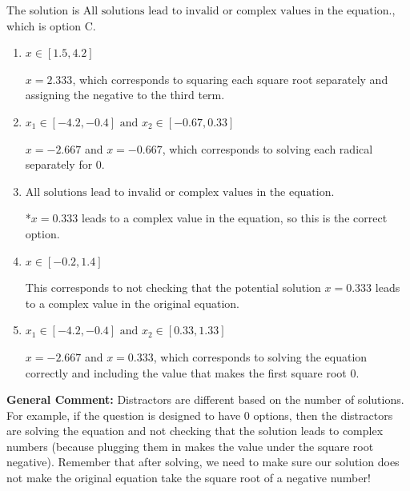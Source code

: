 \documentclass{extbook}[14pt]
\begin{document}
\begin{enumerate}
{The solution is \( \text{All solutions lead to invalid or complex values in the equation.} \), which is option C.\begin{enumerate}[label=\Alph*.]
\item \( x \in [1.5,4.2] \)

$x = 2.333$, which corresponds to squaring each square root separately and assigning the negative to the third term.
\item \( x_1 \in [-4.2, -0.4] \text{ and } x_2 \in [-0.67,0.33] \)

$x = -2.667$ and $x = -0.667$, which corresponds to solving each radical separately for 0.
\item \( \text{All solutions lead to invalid or complex values in the equation.} \)

*$x = 0.333$ leads to a complex value in the equation, so this is the correct option.
\item \( x \in [-0.2,1.4] \)

This corresponds to not checking that the potential solution $x = 0.333$ leads to a complex value in the original equation.
\item \( x_1 \in [-4.2, -0.4] \text{ and } x_2 \in [0.33,1.33] \)

$x = -2.667$ and $x = 0.333$, which corresponds to solving the equation correctly and including the value that makes the first square root 0.
\end{enumerate}

\textbf{General Comment:} Distractors are different based on the number of solutions. For example, if the question is designed to have 0 options, then the distractors are solving the equation and not checking that the solution leads to complex numbers (because plugging them in makes the value under the square root negative). Remember that after solving, we need to make sure our solution does not make the original equation take the square root of a negative number!
}
\end{enumerate}
\end{document}
